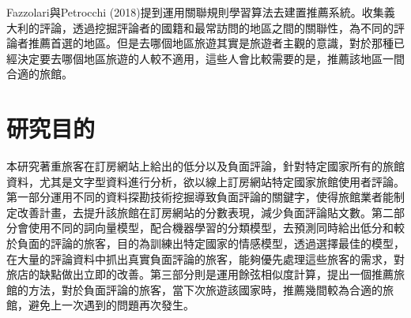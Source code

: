 	Fazzolari與Petrocchi (2018)提到運用關聯規則學習算法去建置推薦系統。收集義大利的評論，透過挖掘評論者的國籍和最常訪問的地區之間的關聯性，為不同的評論者推薦首選的地區。但是去哪個地區旅遊其實是旅遊者主觀的意識，對於那種已經決定要去哪個地區旅遊的人較不適用，這些人會比較需要的是，推薦該地區一間合適的旅館。
	
\newpage
	 
\section{研究目的}
	
	本研究著重旅客在訂房網站上給出的低分以及負面評論，針對特定國家所有的旅館資料，尤其是文字型資料進行分析，欲以線上訂房網站特定國家旅館使用者評論。第一部分運用不同的資料探勘技術挖掘導致負面評論的關鍵字，使得旅館業者能制定改善計畫，去提升該旅館在訂房網站的分數表現，減少負面評論貼文數。第二部分會使用不同的詞向量模型，配合機器學習的分類模型，去預測同時給出低分和較於負面的評論的旅客，目的為訓練出特定國家的情感模型，透過選擇最佳的模型，在大量的評論資料中抓出真實負面評論的旅客，能夠優先處理這些旅客的需求，對旅店的缺點做出立即的改善。第三部分則是運用餘弦相似度計算，提出一個推薦旅館的方法，對於負面評論的旅客，當下次旅遊該國家時，推薦幾間較為合適的旅館，避免上一次遇到的問題再次發生。
	
%

